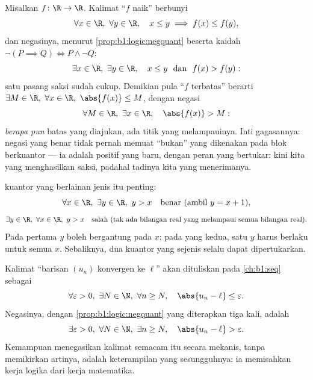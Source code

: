 \begin{example}\label{ex:b1:logic:negpractice}
Misalkan $f \colon \R \to \R$. Kalimat ``$f$ naik'' berbunyi
\[
\forall x \in \R,\ \forall y \in \R,\quad
x \leq y \implies f(x) \leq f(y) ,
\]
dan negasinya, menurut \cref{prop:b1:logic:negquant} beserta kaidah
$\lnot(P \implies Q) \iff P \land \lnot Q$:
\[
\exists x \in \R,\ \exists y \in \R,\quad
x \leq y \ \text{ dan }\ f(x) > f(y) :
\]
satu pasang saksi sudah cukup. Demikian pula ``$f$ terbatas'' berarti
$\exists M \in \R,\ \forall x \in \R,\ \abs{f(x)} \leq M$, dengan
negasi
\[
\forall M \in \R,\ \exists x \in \R,\quad \abs{f(x)} > M :
\]
\emph{berapa pun} batas yang diajukan, ada titik yang melampauinya.
Inti gagasannya: negasi yang benar tidak pernah memuat ``bukan'' yang
dikenakan pada blok berkuantor --- ia adalah  positif yang
baru, dengan peran yang bertukar: kini kita yang menghasilkan saksi,
padahal tadinya kita yang menerimanya.
\end{example}

\begin{example}\label{ex:b1:logic:order}
 kuantor yang berlainan jenis itu penting:
\[
\forall x \in \R,\ \exists y \in \R,\ y > x
\quad\text{benar (ambil } y = x+1\text{),}
\]
\[
\exists y \in \R,\ \forall x \in \R,\ y > x
\quad\text{salah (tak ada bilangan real yang melampaui semua bilangan real).}
\]
Pada  pertama $y$ boleh bergantung pada $x$; pada yang
kedua, satu $y$ harus berlaku untuk semua $x$. Sebaliknya, dua kuantor
yang sejenis selalu dapat dipertukarkan.
\end{example}

\begin{example}\label{ex:b1:logic:limit}
Kalimat ``barisan $(u_n)$ konvergen ke $\ell$'' akan dituliskan pada
\cref{ch:b1:seq} sebagai
\[
\forall \varepsilon > 0,\ \exists N \in \N,\ \forall n \geq N,\quad
\abs{u_n - \ell} \leq \varepsilon .
\]
Negasinya, dengan \cref{prop:b1:logic:negquant} yang diterapkan tiga kali, adalah
\[
\exists \varepsilon > 0,\ \forall N \in \N,\ \exists n \geq N,\quad
\abs{u_n - \ell} > \varepsilon .
\]
Kemampuan menegasikan kalimat semacam itu secara mekanis, tanpa
memikirkan artinya, adalah keterampilan yang sesungguhnya: ia
memisahkan kerja logika dari kerja matematika.
\end{example}

